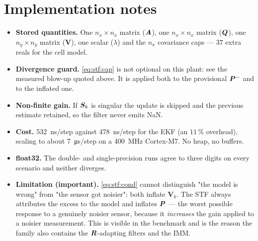 \section{Implementation notes}
\begin{itemize}[leftmargin=1.4em]
\item \textbf{Stored quantities.}  One $n_x\times n_x$ matrix ($\bm{A}$), one $n_x\times n_x$ matrix
      ($\bm{Q}$), one $n_y\times n_y$ matrix ($\bm{V}$), one scalar ($\lambda$) and the $n_x$ covariance
      caps --- $37$ extra reals for the cell model.
\item \textbf{Divergence guard.}  \eqref{eq:stf:cap} is not optional on this plant: see the measured
      blow-up quoted above.  It is applied both to the provisional $\bm{P}^{-}$ and to the inflated one.
\item \textbf{Non-finite gain.}  If $\bm{S}_k$ is singular the update is skipped and the previous
      estimate retained, so the filter never emits NaN.
\item \textbf{Cost.}  \SI{532}{\nano\second}/step against \SI{478}{\nano\second}/step for the EKF
      (an $11\,\%$ overhead), scaling to about \SI{7}{\micro\second}/step on a \SI{400}{\mega\hertz}
      Cortex-M7.  No heap, no buffers.
\item \textbf{float32.}  The double- and single-precision runs agree to three digits on every
      scenario and neither diverges.
\item \textbf{Limitation (important).}  \eqref{eq:stf:cond} cannot distinguish "the model is wrong"
      from "the sensor got noisier": both inflate $\bm{V}_k$.  The STF always attributes the excess to
      the model and inflates $\bm{P}$ --- the worst possible response to a genuinely noisier sensor,
      because it \emph{increases} the gain applied to a noisier measurement.  This is visible in the
      benchmark and is the reason the family also contains the $\bm{R}$-adapting filters and the IMM.
\end{itemize}

